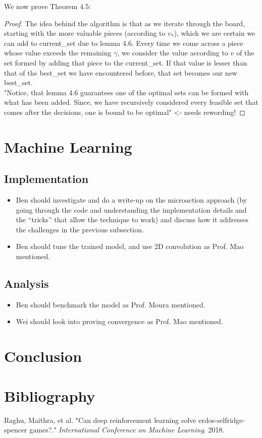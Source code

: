 \documentclass{article}
\theoremstyle{plain}
\theoremstyle{definition}
\theoremstyle{remark}
\begin{document}
We now prove Theorem 4.5:

\begin{proof}
	The idea behind the algorithm is that as we iterate through the board, starting with the more valuable pieces (according to $v_{*}$), which we are certain we can add to current\_set due to lemma 4.6. Every time we come across a piece whose value exceeds the remaining $\gamma$, we consider the value according to $v$ of the set formed by adding that piece to the current\_set. If that value is lesser than that of the best\_set we have encountered before, that set  becomes our new best\_set. \\
	
	"Notice, that lemma 4.6 guarantees one of the optimal sets can be formed with what has been added. Since, we have recursively considered every feasible set that comes after the decisions, one is bound to be optimal"  <- needs rewording!
\end{proof}

\section{Machine Learning}

\subsection{Implementation}

\begin{itemize}
	\item Ben should investigate and do a write-up on the microaction approach (by going through the code and understanding the implementation details and the ``tricks'' that allow the technique to work) and discuss how it addresses the challenges in the previous subsection.
	          
	\item Ben should tune the trained model, and use 2D convolution as Prof. Mao mentioned.
\end{itemize}


\subsection{Analysis}
\begin{itemize}
	\item Ben should benchmark the model as Prof. Moura mentioned.
	\item Wei should look into proving convergence as Prof. Mao mentioned.
\end{itemize}


\section{Conclusion}

\section{Bibliography}


Raghu, Maithra, et al. "Can deep reinforcement learning solve erdos-selfridge-spencer games?." \textit{International Conference on Machine Learning}. 2018.
\end{document}
